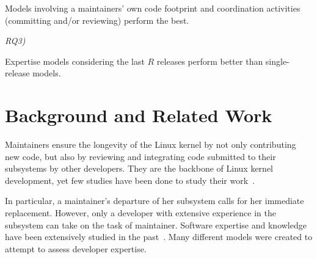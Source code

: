 \begin{myindentpar}{1cm}
Models involving a maintainers' own code footprint and coordination activities (committing and/or reviewing) perform the best.
\end{myindentpar}

\begin{description}
\item[\textit{RQ3)}] \textit{\rqthree }
\end{description}

\begin{myindentpar}{1cm}
Expertise models considering the last $R$ releases perform better than single-release models.
\end{myindentpar}

















\section{Background and Related Work}
\label{sec:backgr-relat-work} 


Maintainers ensure the longevity of the Linux kernel by not only contributing new code, but also by reviewing and integrating code submitted to their subsystems by other developers. They are the backbone of Linux kernel development, yet few studies have been done to study their work~\cite{Zhou-fse}.

In particular, a maintainer's departure of her subsystem calls for her immediate replacement. However, only a developer with extensive experience in the subsystem can take on the task of maintainer. Software expertise and knowledge have been extensively studied in the past~\cite{Bhattacharya, mockus02, McDonald, Fritz-2007}. Many different models were created to attempt to assess developer expertise. 

